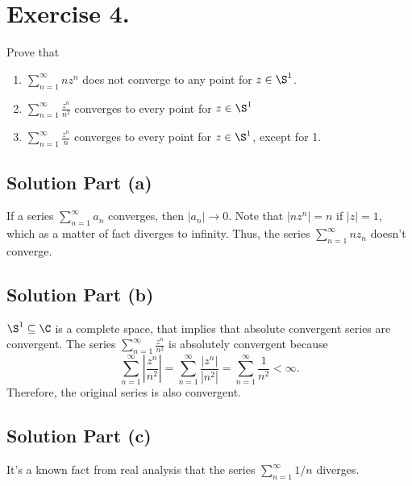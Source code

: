 \section*{Exercise 4.}

Prove that
\begin{enumerate}[label=(\alph*)]
    \item $\sum_{n = 1}^{\infty} n z^n$ does not converge to any point for $z\in \S^1$.
    \item $\sum_{n = 1}^\infty \frac{z^n}{n^2}$ converges to every point for $z \in\S^1$
    \item $\sum_{n = 1}^\infty \frac{z^n}{n}$ converges to every point for $z \in\S^1$, except for 1.
\end{enumerate}

\subsection*{Solution Part (a)}

If a series $\sum_{n = 1}^\infty a_n$ converges, then $|a_n|\to 0$. Note that $|nz^n| = n$ if $|z| = 1$, which as a matter of fact diverges to infinity. Thus, the series $\sum_{n = 1}^\infty n z_n $ doesn't converge.

\subsection*{Solution Part (b)}

$\S^1 \subseteq \C$ is a complete space, that implies that absolute convergent series are convergent. The series $\sum_{n = 1}^\infty \frac{z^n}{n^2}$ is absolutely convergent because
\[ \sum_{n = 1}^\infty \left| \frac{z^n}{n^2} \right| = \sum_{n = 1}^\infty\frac{|z^n|}{|n^2|} = \sum_{n = 1}^\infty \frac{1}{n^2} < \infty. \]
Therefore, the original series is also convergent.

\subsection*{Solution Part (c)}

It's a known fact from real analysis that the series $\sum_{n = 1}^\infty 1/n$ diverges.

